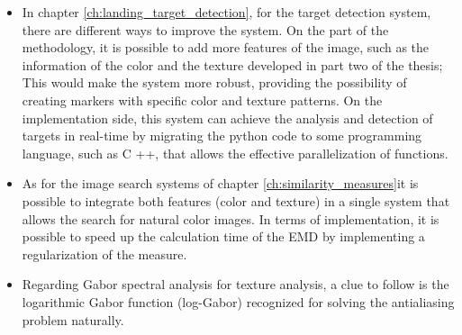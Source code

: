 \begin{itemize}
	\item In chapter \ref{ch:landing_target_detection}, for the target detection system, there are different ways to improve the system. On the part of the methodology, it is possible to add more features of the image, such as the information of the color and the texture developed in part two of the thesis; This would make the system more robust, providing the possibility of creating markers with specific color and texture patterns. On the implementation side, this system can achieve the analysis and detection of targets in real-time by migrating the python code to some programming language, such as C ++, that allows the effective parallelization of functions.
	 \item As for the image search systems of chapter \ref{ch:similarity_measures}it is possible to integrate both features (color and texture) in a single system that allows the search for natural color images. In terms of implementation, it is possible to speed up the calculation time of the EMD by implementing a regularization of the measure.
	 \item Regarding Gabor spectral analysis for texture analysis, a clue to follow is the logarithmic Gabor function (log-Gabor) recognized for solving the antialiasing problem naturally.
\end{itemize}

